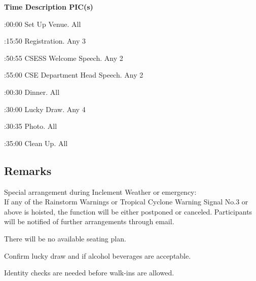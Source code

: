 \bTR\bTH    \bf{Time}
\eTH\bTH    \bf{Description}
\eTH\bTH    \bf{PIC(s)}
\eTH\eTR

\eTABLEhead
\bTABLEbody

\bTR{}:00:00
\eTD\bTD Set Up Venue.
\eTD\bTD All
\eTD\eTR

\bTR{}:15:50
\eTD\bTD Registration.
\eTD\bTD Any 3
\eTD\eTR

\bTR{}:50:55
\eTD\bTD CSESS Welcome Speech.
\eTD\bTD Any 2
\eTD\eTR

\bTR{}:55:00
\eTD\bTD CSE Department Head Speech.
\eTD\bTD Any 2
\eTD\eTR

\bTR{}:00:30
\eTD\bTD Dinner.
\eTD\bTD All
\eTD\eTR

\bTR{}:30:00
\eTD\bTD Lucky Draw.
\eTD\bTD Any 4
\eTD\eTR

\bTR{}:30:35
\eTD\bTD Photo.
\eTD\bTD All
\eTD\eTR

\bTR{}:35:00
\eTD\bTD Clean Up.
\eTD\bTD All
\eTD\eTR

\eTABLEbody
\eTABLE

\subsection{Remarks}
\startitemize
\item Special arrangement during Inclement Weather or emergency: \\
If any of the Rainstorm Warnings or Tropical Cyclone Warning Signal No.3 or above is hoisted, the function will be either postponed or canceled. Participants will be notified of further arrangements through email.
\item There will be no available seating plan.
\item Confirm lucky draw and if alcohol beverages are acceptable.
\item Identity checks are needed before walk-ins are allowed.
\stopitemize

\stopsection
\pagebreak
